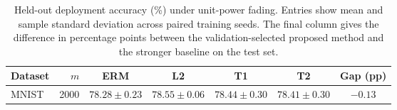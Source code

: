 \begin{table}[htb]
\centering
\caption{Held-out deployment accuracy (\%) under unit-power fading. Entries show mean and sample standard deviation across paired training seeds. The final column gives the difference in percentage points between the validation-selected proposed method and the stronger baseline on the test set.}
\label{tab:unit-power-sweep}
\begin{tabular}{lrccccc}
\toprule
Dataset & $m$ & ERM & L2 & T1 & T2 & Gap (pp) \\
\midrule
MNIST & 2000 & $78.28\pm0.23$ & $\mathbf{78.55}\pm0.06$ & $78.44\pm0.30$ & $78.41\pm0.30$ & $-0.13$ \\
\bottomrule
\end{tabular}
\end{table}
